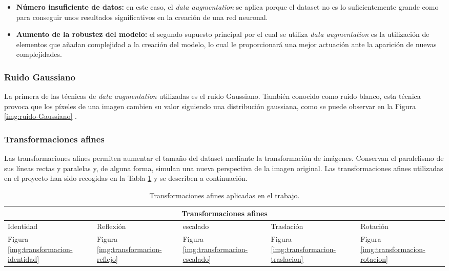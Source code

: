 \begin{itemize}
	\item \textbf{Número insuficiente de datos:} en este caso, el \textit{data augmentation} se aplica porque el dataset no es lo suficientemente grande como para conseguir unos resultados 
significativos en la creación de una red neuronal.
	\item \textbf{Aumento de la robustez del modelo:} el segundo supuesto principal por el cual se utiliza \textit{data augmentation} es la utilización de elementos que añadan complejidad a la
creación del modelo, lo cual le proporcionará una mejor actuación ante la aparición de nuevas complejidades.
\end{itemize}

\subsubsection{Ruido Gaussiano}

La primera de las técnicas de \textit{data augmentation} utilizadas es el ruido Gaussiano. 
También conocido como ruido blanco, esta técnica provoca que los píxeles de una imagen cambien su valor siguiendo una distribución gaussiana, como se puede observar en la Figura \ref{img:ruido-Gaussiano} .


\subsubsection{Transformaciones afines} \label{transformacionesafines}

Las transformaciones afines permiten aumentar el tamaño del dataset mediante la transformación de imágenes. Conservan el paralelismo de sus líneas rectas y paralelas y, de alguna forma, simulan una nueva perspectiva de la imagen original.
Las transformaciones afines utilizadas en el proyecto han sido recogidas en la Tabla \ref{tabla:transformaciones-afines} y se describen a continuación.

\begin{table}[h!]
\begin{tabular}{ |p{2cm}|p{1.8cm}|p{2.2cm} |p{2cm}|p{2cm}|}
	\hline
	\multicolumn{5}{|c|}{Transformaciones afines}\\ 
	\hline
	Identidad & Reflexión &escalado & Traslación  & Rotación\\
	\hline
	Figura \ref{img:transformacion-identidad} & Figura \ref{img:transformacion-reflejo}     & Figura \ref{img:transformacion-escalado} &   Figura \ref{img:transformacion-traslacion} &   Figura \ref{img:transformacion-rotacion}\\
	\hline
\end{tabular}
\caption{\label{tabla:transformaciones-afines}Transformaciones afines aplicadas en el trabajo.}
\end{table}


